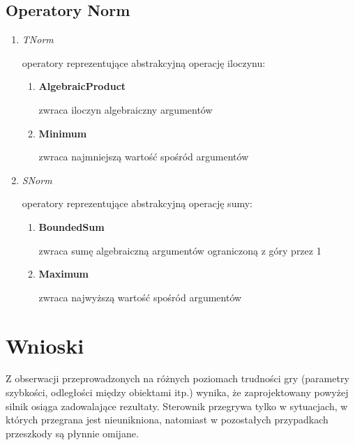 \documentclass{article}
\begin{document}
\subsection {Operatory Norm}

\begin{enumerate}
\item \emph{TNorm}

  operatory reprezentujące abstrakcyjną operację iloczynu:

  \begin{enumerate}
  \item \textbf{AlgebraicProduct}

    zwraca iloczyn algebraiczny argumentów

  \item \textbf{Minimum}

    zwraca najmniejszą wartość spośród argumentów

  \end{enumerate}

\item \emph{SNorm}

  operatory reprezentujące abstrakcyjną operację sumy:

  \begin{enumerate}
  \item \textbf{BoundedSum}

    zwraca sumę algebraiczną argumentów ograniczoną z góry przez 1

  \item \textbf{Maximum}

    zwraca najwyższą wartość spośród argumentów

  \end{enumerate}

\end{enumerate}

\section {Wnioski}

Z obserwacji przeprowadzonych na różnych poziomach trudności gry (parametry
szybkości, odległości między obiektami itp.) wynika, że zaprojektowany powyżej
silnik osiąga zadowalające rezultaty. Sterownik przegrywa tylko w sytuacjach, w
których przegrana jest nieunikniona, natomiast w pozostałych przypadkach
przeszkody są płynnie omijane.
\end{document}
